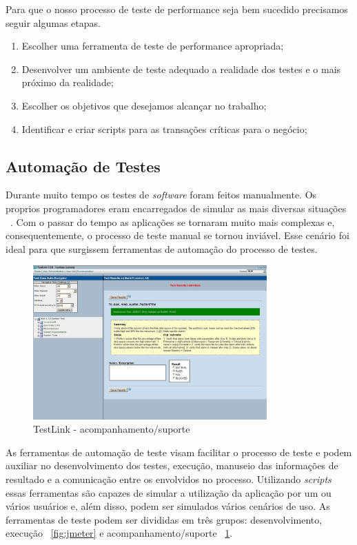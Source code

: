 Para que o nosso processo de teste de performance seja bem sucedido precisamos seguir algumas etapas.

\begin{enumerate}
\item Escolher uma ferramenta de teste de performance apropriada;
\item Desenvolver um ambiente de teste adequado a realidade dos testes e o mais próximo da realidade;
\item Escolher os objetivos que desejamos alcançar no trabalho;
\item Identificar e criar scripts para as transações críticas para o negócio;
\end{enumerate}


\subsection{Automação de Testes}

Durante muito tempo os testes de \textit{software} foram feitos manualmente. Os proprios programadores eram encarregados de simular as mais diversas situações ~\cite{rios2006teste}. Com o passar do tempo as aplicações se tornaram muito mais complexas e, consequentemente, o processo de teste manual se tornou inviável. Esse cenário foi ideal para que surgissem ferramentas de automação do processo de testes.

	\begin{figure}[!htbp]
		\begin{center}
			\includegraphics[width=0.8\textwidth]{testlink}
		\end{center}
		\caption{TestLink - acompanhamento/suporte ~\cite{siteTestLink}}
		\label{fig:testlink}
	\end{figure}

As ferramentas de automação de teste visam facilitar o processo de teste e podem auxiliar no desenvolvimento dos testes, execução, manuseio das informações de resultado e a comunicação entre os envolvidos no processo. Utilizando \textit{scripts} essas ferramentas são capazes de simular a utilização da aplicação por um ou vários usuários e, além disso, podem ser simulados vários cenários de uso. As ferramentas de teste podem ser divididas em três grupos: desenvolvimento, execução ~\ref{fig:jmeter} e acompanhamento/suporte ~\ref{fig:testlink}.

